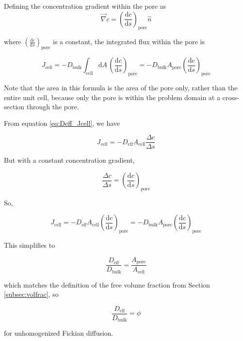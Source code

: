 Defining the concentration gradient within the pore as
\begin{equation}
\vec{\nabla} c = \left(\frac{\mathrm{d}c}{\mathrm{d}s}\right)_{\mathrm{pore}} \hat{n}
\end{equation}

where $\left(\frac{\mathrm{d}c}{\mathrm{d}s}\right)_{\mathrm{pore}}$ is a constant,
the integrated flux within the pore is

\begin{equation}
J_\mathrm{cell} = -D_\mathrm{bulk} \int_\mathrm{cell} \mathrm{d}A\, \left(\frac{\mathrm{d}c}{\mathrm{d}s}\right)_{\mathrm{pore}}
 = -D_\mathrm{bulk} A_\mathrm{pore} \left(\frac{\mathrm{d}c}{\mathrm{d}s}\right)_{\mathrm{pore}}
\end{equation}

Note that the area in this formula is the area of the pore only,
rather than the entire unit cell, because only the pore is within the problem domain
at a cross-section through the pore.

From equation \ref{eq:Deff_Jcell}, we have

\begin{equation}
J_{\mathrm{cell}} = - D_{\mathrm{eff}} A_{\mathrm{cell}} \frac{\Delta c}{\Delta s}
\end{equation}

But with a constant concentration gradient,

\begin{equation}
\frac{\Delta c}{\Delta s} = \left(\frac{\mathrm{d}c}{\mathrm{d}s}\right)_{\mathrm{pore}}
\end{equation}

So,

\begin{equation}
J_{\mathrm{cell}} = - D_{\mathrm{eff}} A_{\mathrm{cell}} \left(\frac{\mathrm{d}c}{\mathrm{d}s}\right)_{\mathrm{pore}}
 = -D_\mathrm{bulk} A_\mathrm{pore} \left(\frac{\mathrm{d}c}{\mathrm{d}s}\right)_{\mathrm{pore}}
\end{equation}

This simplifies to

\begin{equation}
\frac{D_\mathrm{eff}}{D_\mathrm{bulk}} = \frac{A_\mathrm{pore}}{A_\mathrm{cell}}
\end{equation}

which matches the definition of the free volume fraction from Section \ref{subsec:volfrac}, so

\begin{equation}
\frac{D_\mathrm{eff}}{D_\mathrm{bulk}} = \phi
\end{equation}

for unhomogenized Fickian diffusion.
